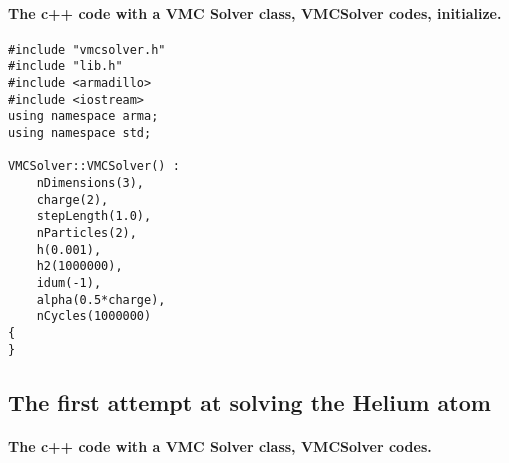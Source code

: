 \documentclass[%
twoside,                 %
final,                   %
10pt]{article}
\begin{document}
\paragraph{The c++ code with a VMC Solver class, VMCSolver codes, initialize.}

\begin{verbatim}
#include "vmcsolver.h"
#include "lib.h"
#include <armadillo>
#include <iostream>
using namespace arma;
using namespace std;

VMCSolver::VMCSolver() :
    nDimensions(3),
    charge(2),
    stepLength(1.0),
    nParticles(2),
    h(0.001),
    h2(1000000),
    idum(-1),
    alpha(0.5*charge),
    nCycles(1000000)
{
}
\end{verbatim}




\subsection*{The first attempt at solving the Helium atom}

\paragraph{The c++ code with a VMC Solver class, VMCSolver codes.}
\end{document}
